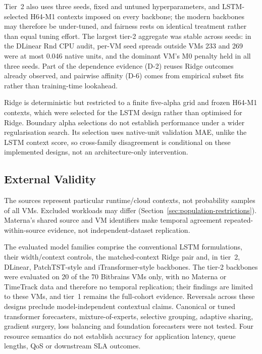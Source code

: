 \documentclass[5p,twocolumn]{elsarticle}
\begin{document}
Tier~2 also uses three seeds, fixed and untuned hyperparameters, and
LSTM-selected H64-M1 contexts imposed on every backbone; the modern
backbones may therefore be under-tuned, and fairness rests on identical
treatment rather than equal tuning effort. The largest tier-2 aggregate was
stable across seeds: in the DLinear Rnd CPU audit, per-VM seed spreads
outside VMs 233 and 269 were at most 0.046 native units, and the
dominant VM's M0 penalty held in all three seeds. Part of the dependence
evidence (D-2) reuses Ridge outcomes already observed, and pairwise affinity
(D-6) comes from empirical subset fits rather than training-time lookahead.

Ridge is deterministic but restricted to a finite five-alpha grid and frozen
H64-M1 contexts, which were selected for the LSTM design rather than optimised
for Ridge. Boundary alpha selections do not establish performance under a
wider regularisation search. Its selection uses native-unit validation MAE,
unlike the LSTM context score, so cross-family disagreement is conditional on
these implemented designs, not an architecture-only intervention.

\subsection{External Validity}
\label{sec:threats-external}

The sources represent particular runtime/cloud contexts, not probability
samples of all VMs. Excluded workloads may differ
(Section~\ref{sec:population-restrictions}). Materna's shared source and VM
identifiers make temporal agreement repeated-within-source evidence, not
independent-dataset replication.

The evaluated model families comprise the conventional LSTM formulations,
their width/context controls, the matched-context Ridge pair and, in tier~2,
DLinear, PatchTST-style and iTransformer-style backbones. The tier-2
backbones were evaluated on 20 of the 70 Bitbrains VMs only, with no
Materna or TimeTrack data and therefore no temporal replication; their
findings are limited to these VMs, and tier~1 remains the full-cohort
evidence. Reversals across these designs preclude model-independent
contextual claims. Canonical or tuned transformer forecasters,
mixture-of-experts, selective grouping, adaptive sharing, gradient surgery,
loss balancing and foundation forecasters were not tested. Four resource
semantics do not establish accuracy for application latency, queue lengths,
QoS or downstream SLA outcomes.
\end{document}
